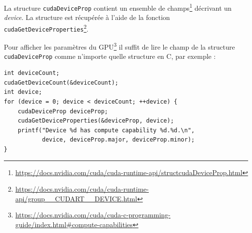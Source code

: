 \begin{howto}{}
La structure {\tt cudaDeviceProp} contient un ensemble de champs\footnote{\url{https://docs.nvidia.com/cuda/cuda-runtime-api/structcudaDeviceProp.html}} décrivant un {\it device}. La structure est récupérée à l'aide de la fonction {\tt cudaGetDeviceProperties}\footnote{\url{https://docs.nvidia.com/cuda/cuda-runtime-api/group__CUDART__DEVICE.html}}.
\end{howto} 


\begin{howto}{}
Pour afficher les paramètres du GPU\footnote{\url{https://docs.nvidia.com/cuda/cuda-c-programming-guide/index.html\#compute-capabilities}} il suffit de lire le champ de la structure {\tt cudaDeviceProp} comme n'importe quelle structure en C, par exemple :\vspace{-0.5em}
\begin{Verbatim}
int deviceCount;
cudaGetDeviceCount(&deviceCount);
int device;
for (device = 0; device < deviceCount; ++device) {
    cudaDeviceProp deviceProp;
    cudaGetDeviceProperties(&deviceProp, device);
    printf("Device %d has compute capability %d.%d.\n",
           device, deviceProp.major, deviceProp.minor);
}
\end{Verbatim}
\end{howto} 
